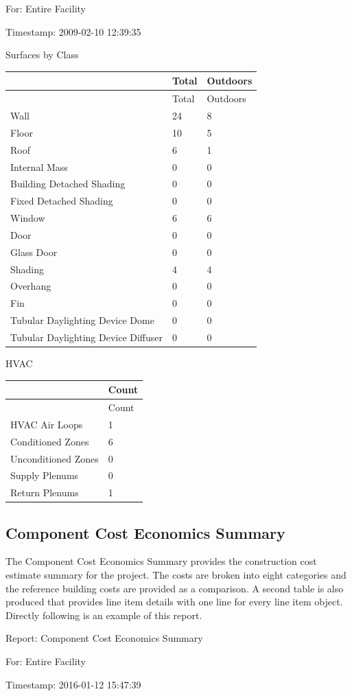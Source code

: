 For: Entire Facility

Timestamp: 2009-02-10 12:39:35

Surfaces by Class

\begin{longtable}[c]{@{}lll@{}}
\toprule
~ & Total & Outdoors \tabularnewline
\midrule
\endfirsthead

\toprule
~ & Total & Outdoors \tabularnewline
\midrule
\endhead

Wall & 24 & 8 \tabularnewline
Floor & 10 & 5 \tabularnewline
Roof & 6 & 1 \tabularnewline
Internal Mass & 0 & 0 \tabularnewline
Building Detached Shading & 0 & 0 \tabularnewline
Fixed Detached Shading & 0 & 0 \tabularnewline
Window & 6 & 6 \tabularnewline
Door & 0 & 0 \tabularnewline
Glass Door & 0 & 0 \tabularnewline
Shading & 4 & 4 \tabularnewline
Overhang & 0 & 0 \tabularnewline
Fin & 0 & 0 \tabularnewline
Tubular Daylighting Device Dome & 0 & 0 \tabularnewline
Tubular Daylighting Device Diffuser & 0 & 0 \tabularnewline
\bottomrule
\end{longtable}

HVAC

\begin{longtable}[c]{@{}ll@{}}
\toprule
~ & Count \tabularnewline
\midrule
\endfirsthead

\toprule
~ & Count \tabularnewline
\midrule
\endhead

HVAC Air Loops & 1 \tabularnewline
Conditioned Zones & 6 \tabularnewline
Unconditioned Zones & 0 \tabularnewline
Supply Plenums & 0 \tabularnewline
Return Plenums & 1 \tabularnewline
\bottomrule
\end{longtable}

\subsection{Component Cost Economics Summary}\label{component-cost-economics-summary}

The Component Cost Economics Summary provides the construction cost estimate summary for the project. The costs are broken into eight categories and the reference building costs are provided as a comparison. A second table is also produced that provides line item details with one line for every line item object. Directly following is an example of this report.

Report: Component Cost Economics Summary

For: Entire Facility

Timestamp: 2016-01-12 15:47:39


